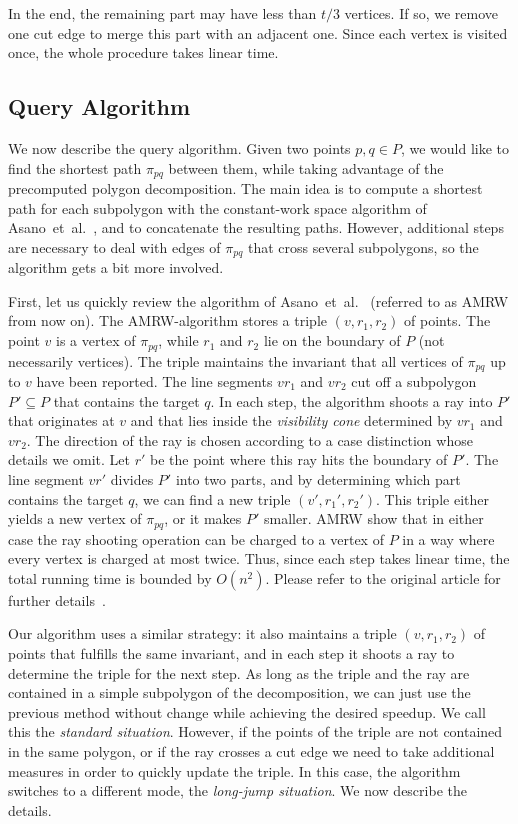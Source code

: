 \documentclass[11pt,a4paper]{article}
\newcommand{\etal}{et~al.}
\begin{document}
In the end, the remaining part may have less than $t/3$ vertices. If so,
we remove one cut edge to merge this part with an adjacent one.
Since each vertex is visited once, the whole procedure takes linear time.


\subsection{Query Algorithm}
We now describe the query algorithm. Given two points $p ,q \in P$,
we would like to find the shortest path $\pi_{pq}$ between them,
while taking advantage of the precomputed polygon decomposition. The main idea
is to compute a shortest path for each subpolygon with the constant-work space
algorithm of Asano~\etal~\cite{AsanoMuRoWa11},
and to concatenate the resulting paths. However, additional steps are
necessary to deal with edges of $\pi_{pq}$ that cross several subpolygons,
so the algorithm gets a bit more involved.

First, let us quickly review the algorithm of
Asano~\etal~\cite{AsanoMuRoWa11} (referred to as AMRW from now on).
The AMRW-algorithm stores a triple $(v, r_1, r_2)$ of points.
The point $v$ is a vertex of $\pi_{pq}$, while $r_1$ and $r_2$ lie on
the boundary of $P$ (not necessarily vertices). The triple maintains the invariant
that all vertices of $\pi_{pq}$ up to $v$
have been reported. The line segments $vr_1$ and $vr_2$ cut off a
subpolygon $P' \subseteq P$ that contains the target $q$.
In each step, the algorithm shoots a ray into $P'$ that originates at $v$ and
that lies inside the \emph{visibility cone} determined by $vr_1$ and $vr_2$.
The direction of the ray is chosen according to a case distinction
whose details we omit. Let $r'$ be the point where this ray hits
the boundary of $P'$. The line segment $vr'$ divides
$P'$ into two parts, and by determining which part
contains the target $q$, we can find a new
triple $(v', r_1', r_2')$. This triple either yields a new vertex of $\pi_{pq}$,
or it makes $P'$ smaller.
AMRW show that in either case the ray shooting operation can be
charged to a vertex of $P$ in a way where every vertex is charged at most twice.
Thus, since each step takes linear time, the total
running time is bounded by $O(n^2)$. Please refer to
the original article for further details~\cite{AsanoMuRoWa11}.

Our algorithm uses a similar strategy: it also maintains a triple $(v,r_1,r_2)$
of points that fulfills the same invariant, and in each step it shoots a ray
to determine the triple for the next step. As long as the triple and the
ray are contained in a simple subpolygon of the decomposition, we can just
use the previous method without change while achieving the desired speedup.
We call this the \emph{standard situation}. However, if the points of the
triple are not contained in the same polygon, or if the ray crosses a cut edge
we need to take additional measures in order to quickly update the triple.
In this case, the algorithm switches to a different mode, the
\emph{long-jump situation}. We now describe the details.
\end{document}
